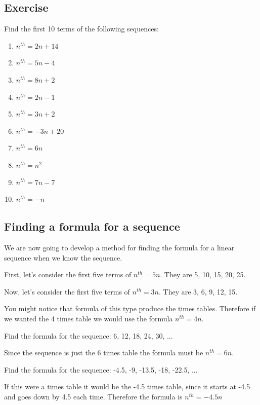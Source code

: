\subsection{Exercise}
Find the first 10 terms of the following sequences:
\begin{enumerate}
	\item $n^{th}=2n+14$
	\item $n^{th}=5n-4$
	\item $n^{th}=8n+2$
	\item $n^{th}=2n-1$
	\item $n^{th}=3n+2$
	\item $n^{th}=-3n+20$
	\item $n^{th}=6n$
	\item $n^{th}=n^2$
	\item $n^{th}=7n-7$
	\item $n^{th}=-n$
\end{enumerate}

\subsection{Finding a formula for a sequence}
We are now going to develop a method for finding the formula for a linear sequence when we know the sequence.

First, let's consider the first five terms of $n^{th}=5n$.  They are 5, 10, 15, 20, 25.

Now, let's consider the first five terms of $n^{th}=3n$.  They are 3, 6, 9, 12, 15.

You might notice that formula of this type produce the times tables.  Therefore if we wanted the 4 times table we would use the formula $n^{th}=4n$.


\begin{exmp}
Find the formula for the sequence: 6, 12, 18, 24, 30, ...

\bigskip

Since the sequence is just the 6 times table the formula must be $n^{th}=6n$.
\end{exmp}

\begin{exmp}
Find the formula for the sequence: -4.5, -9, -13.5, -18, -22.5, ...

\bigskip

If this were a times table it would be the -4.5 times table, since it starts at -4.5 and goes down by 4.5 each time.  Therefore the formula is $n^{th}=-4.5n$
\end{exmp}

